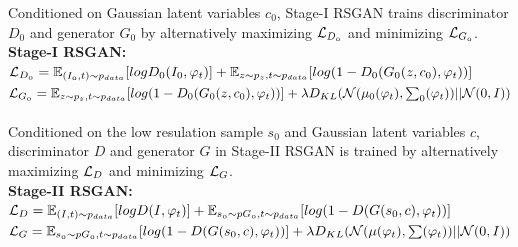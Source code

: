 \documentclass[landscape,a0paper,fontscale=0.285]{baposter} %
\begin{document}
\begin{poster}
{{Conditioned on Gaussian latent variables $c_0$, {Stage-I RSGAN} trains discriminator $D_0$ and generator $G_0$ by alternatively maximizing $\mathcal{L_\mathnormal{D_0}}$ and minimizing $\mathcal{L_\mathnormal{G_0}}$.
}
\\
{\textbf{Stage-I RSGAN: }\\
$\mathcal{L_\mathnormal{D_0}} = \mathbb{E_\mathnormal{(I_0,t) \sim p_{data} }} [log D_0(I_0,\varphi_t)] + \mathbb{E_\mathnormal{z \sim p_z, t \sim p_{data} }} [log (1-D_0(G_0(z,c_0), \varphi_t))]$
\\
$\mathcal{L_\mathnormal{G_0}} =  \mathbb{E_\mathnormal{z \sim p_z, t \sim p_{data} }} [log (1-D_0(G_0(z,c_0), \varphi_t))] + \lambda D_{KL} (\mathcal{N}(\mu_0(\varphi_t), \sum_0 (\varphi_t)) || \mathcal{N}(0,I))$
}
\\\\
{Conditioned on the low resulation sample $s_0$ and Gaussian latent variables $c$, discriminator $D$ and generator $G$ in {Stage-II RSGAN} is trained  by alternatively maximizing $\mathcal{L_\mathnormal{D}}$ and minimizing $\mathcal{L_\mathnormal{G}}$.
}
\\
{\textbf{Stage-II RSGAN: }\\
$\mathcal{L_\mathnormal{D}} = \mathbb{E_\mathnormal{(I,t) \sim p_{data} }} [log D(I,\varphi_t)] + \mathbb{E_\mathnormal{s_0 \sim pG_0, t \sim p_{data} }} [log (1-D(G(s_0,c), \varphi_t))]$
\\
$\mathcal{L_\mathnormal{G}} =  \mathbb{E_\mathnormal{s_0 \sim pG_0, t \sim p_{data} }} [log (1-D(G(s_0,c), \varphi_t))] + \lambda D_{KL} (\mathcal{N}(\mu(\varphi_t), \sum (\varphi_t)) || \mathcal{N}(0,I))$
}
%


}
\end{poster}
\end{document}
